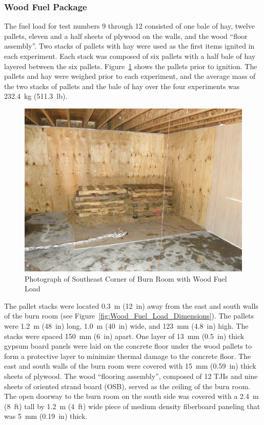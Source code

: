 \documentclass[12pt,oneside]{book}
\begin{document}
\subsubsection{Wood Fuel Package}
\label{sec:fire_suppression_pallet_fuel}

The fuel load for test numbers 9 through 12 consisted of one bale of hay, twelve pallets, eleven and a half sheets of plywood on the walls, and the wood ``floor assembly''. Two stacks of pallets with hay were used as the first items ignited in each experiment. Each stack was composed of six pallets with a half bale of hay layered between the six pallets. Figure~\ref{fig:Wood_Fuel_Load} shows the pallets prior to ignition. The pallets and hay were weighed prior to each experiment, and the average mass of the two stacks of pallets and the bale of hay over the four experiments was 232.4~kg (511.3~lb).

\begin{figure}[!ht]
	\includegraphics[width=0.65\columnwidth]{../Figures/Pictures/Wood_Fuel_Package}
	\caption{Photograph of Southeast Corner of Burn Room with Wood Fuel Load}
	\label{fig:Wood_Fuel_Load}
\end{figure}

The pallet stacks were located 0.3~m (12~in) away from the east and south walls of the burn room (see Figure~\ref{fig:Wood_Fuel_Load_Dimensions}). The pallets were 1.2~m (48~in) long, 1.0~m (40~in) wide, and 123~mm (4.8~in) high. The stacks were spaced 150~mm (6~in) apart. One layer of 13~mm (0.5~in) thick gypsum board panels were laid on the concrete floor under the wood pallets to form a protective layer to minimize thermal damage to the concrete floor. The east and south walls of the burn room were covered with 15~mm (0.59~in) thick sheets of plywood.  The wood ``flooring assembly'', composed of 12 TJIs and nine sheets of oriented strand board (OSB), served as the ceiling of the burn room. The open doorway to the burn room on the south side was covered with a 2.4~m (8~ft) tall by 1.2~m (4~ft) wide piece of medium density fiberboard paneling that was 5~mm (0.19~in) thick.
\end{document}
